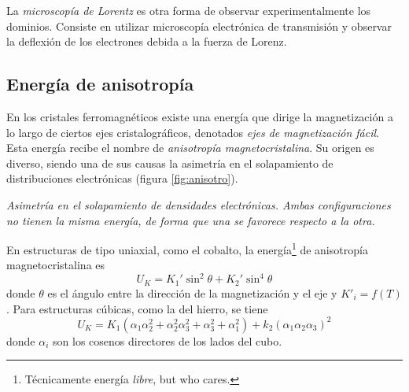 \documentclass{tufte-book}
\newcommand{\sub}[1]{_{{\scriptscriptstyle\mathit{#1}}}}
\begin{document}
La \emph{microscopía de Lorentz} es otra forma de observar
experimentalmente los dominios. Consiste en utilizar microscopía
electrónica de transmisión y observar la deflexión de los electrones
debida a la fuerza de Lorenz.

\subsection{Energía de anisotropía}

En los cristales ferromagnéticos existe una energía que dirige la
magnetización a lo largo de ciertos ejes cristalográficos, denotados
\emph{ejes de magnetización fácil}. Esta energía recibe el nombre de
\emph{anisotropía magnetocristalina}. Su origen es diverso, siendo una
de sus causas la asimetría en el solapamiento de distribuciones
electrónicas (figura \ref{fig:anisotro}).

\begin{marginfigure}
  \centering
  \caption{\itshape Asimetría en el solapamiento de densidades electrónicas.
    Ambas configuraciones no tienen la misma energía, de forma que una
    se favorece respecto a la otra.}
  \label{fig:anisotro}
\end{marginfigure}

En estructuras de tipo uniaxial, como el cobalto, la
energía\footnote{Técnicamente energía \emph{libre}, but who cares.} de
anisotropía magnetocristalina es
\begin{equation}
  U\sub{K} = K_1' \sin^2θ + K_2'\sin^4θ
\end{equation}
donde $θ$ es el ángulo entre la dirección de la magnetización y el eje
y $K'_i = f(T)$. Para estructuras cúbicas, como la del hierro, se
tiene
\begin{equation}
  U\sub{K} = K_1(α_1α_2^2 + α_2^2α_3^2 + α_3^2 + α_1^2) + k_2 (α_1α_2α_3)^2
\end{equation}
donde $α_i$ son los cosenos directores de los lados del cubo.
\end{document}
